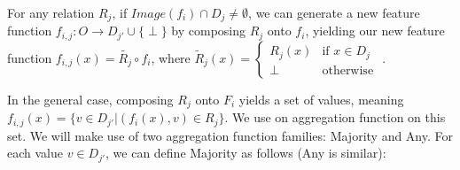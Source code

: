 \documentclass{article}
\theoremstyle{definition}
\begin{document}
For any relation $R_j$, if $Image(f_i) \cap D_j \neq\emptyset$, we can generate a new feature function $f_{i,j}:O\rightarrow D_{j'}\cup\{\perp\}$ by composing $R_j$ onto $f_i$, yielding our new feature function  $f_{i,j}(x)=\tilde{R_j}\circ f_i$, where $\tilde{R}_j(x)=\begin{cases} R_j(x) &\mbox{if } x\in D_j\\ 
\perp & \mbox{otherwise } \end{cases}$.


In the general case, composing $R_j$ onto $F_i$ yields a set of values, meaning $f_{i,j}(x)=\{v\in D_{j'}|(f_i(x),v)\in R_j\}$. 
We use on aggregation function on this set.
We will make use of two aggregation function families: Majority and Any.
For each value $v\in D_{j'}$, we can define Majority as follows (Any is similar):
 
\end{document}
